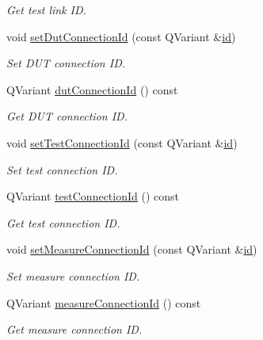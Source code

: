 \begin{DoxyCompactItemize}
\begin{DoxyCompactList}\small\item\em Get test link I\-D. \end{DoxyCompactList}\item 
void \hyperlink{classmdt_tt_test_model_item_route_data_a39994d10e123601443fed05a5968bf02}{set\-Dut\-Connection\-Id} (const Q\-Variant \&\hyperlink{classmdt_tt_test_model_item_route_data_ad34638a6361e64a867f30821b73ff385}{id})
\begin{DoxyCompactList}\small\item\em Set D\-U\-T connection I\-D. \end{DoxyCompactList}\item 
Q\-Variant \hyperlink{classmdt_tt_test_model_item_route_data_afd8421d44dd279d2276cdf0aacfe8f6f}{dut\-Connection\-Id} () const 
\begin{DoxyCompactList}\small\item\em Get D\-U\-T connection I\-D. \end{DoxyCompactList}\item 
void \hyperlink{classmdt_tt_test_model_item_route_data_afdaa11c1608e78d7dc888e369b4d88cd}{set\-Test\-Connection\-Id} (const Q\-Variant \&\hyperlink{classmdt_tt_test_model_item_route_data_ad34638a6361e64a867f30821b73ff385}{id})
\begin{DoxyCompactList}\small\item\em Set test connection I\-D. \end{DoxyCompactList}\item 
Q\-Variant \hyperlink{classmdt_tt_test_model_item_route_data_af19d1c8c5050a14ab7e55700544877d5}{test\-Connection\-Id} () const 
\begin{DoxyCompactList}\small\item\em Get test connection I\-D. \end{DoxyCompactList}\item 
void \hyperlink{classmdt_tt_test_model_item_route_data_ad7de5db4f37be0695a4bb02c49f827e3}{set\-Measure\-Connection\-Id} (const Q\-Variant \&\hyperlink{classmdt_tt_test_model_item_route_data_ad34638a6361e64a867f30821b73ff385}{id})
\begin{DoxyCompactList}\small\item\em Set measure connection I\-D. \end{DoxyCompactList}\item 
Q\-Variant \hyperlink{classmdt_tt_test_model_item_route_data_ad1cd545385747807beb563ef5042ecf4}{measure\-Connection\-Id} () const 
\begin{DoxyCompactList}\small\item\em Get measure connection I\-D. \end{DoxyCompactList}\item 

\end{DoxyCompactItemize}
